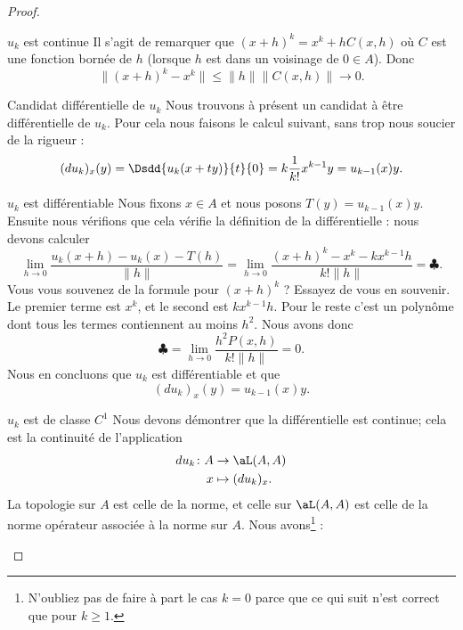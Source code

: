 \begin{proof}
\begin{subproof}
		\item[\( u_k\) est continue]
		Il s'agit de remarquer que \( (x+h)^k=x^k+hC(x,h)\) où \( C\) est une fonction bornée de \( h\) (lorsque \( h\) est dans un voisinage de \( 0\in A\)). Donc
		\begin{equation}
			\| (x+h)^k-x^k \|\leq \| h \|\| C(x,h) \|\to 0.
		\end{equation}
		\item[Candidat différentielle de \( u_k\)]
		Nous trouvons à présent un candidat à être différentielle de \( u_k\). Pour cela nous faisons le calcul suivant, sans trop nous soucier de la rigueur :
		\begin{equation}
			(du_k)_x(y)=\Dsdd{ u_k(x+ty) }{t}{0}=k\frac{1}{ k! }x^{k-1}y=u_{k-1}(x)y.
		\end{equation}
		\item[\( u_k\) est différentiable]
		Nous fixons \( x\in A\) et nous posons \( T(y)=u_{k-1}(x)y\). Ensuite nous vérifions que cela vérifie la définition de la différentielle : nous devons calculer
		\begin{equation}        \label{EQooNPKGooVmEYAV}
			\lim_{h\to 0} \frac{ u_k(x+h)-u_k(x)-T(h) }{ \| h \| }=\lim_{h\to 0} \frac{ (x+h)^k-x^k-kx^{k-1}h }{ k! \| h \| }=\clubsuit.
		\end{equation}
		Vous vous souvenez de la formule pour \( (x+h)^k\) ? Essayez de vous en souvenir. Le premier terme est \( x^k\), et le second est \( kx^{k-1}h\). Pour le reste c'est un polynôme dont tous les termes contiennent au moins \( h^2\). Nous avons donc
		\begin{equation}
			\clubsuit=\lim_{h\to 0} \frac{ h^2P(x,h) }{ k!\| h \| }=0.
		\end{equation}
		Nous en concluons que \( u_k\) est différentiable et que
		\begin{equation}
			(du_k)_x(y)=u_{k-1}(x)y.
		\end{equation}
		\item[\( u_k\) est de classe \( C^1\)]
		Nous devons démontrer que la différentielle est continue; cela est la continuité de l'application
		\begin{equation}
			\begin{aligned}
				du_k\colon A & \to \aL(A,A)      \\
				x            & \mapsto (du_k)_x.
			\end{aligned}
		\end{equation}
		La topologie sur \( A\) est celle de la norme, et celle sur \( \aL(A,A)\) est celle de la norme opérateur associée à la norme sur \( A\). Nous avons\footnote{N'oubliez pas de faire à part le cas \( k=0\) parce que ce qui suit n'est correct que pour \( k\geq 1\).} :

\end{subproof}
\end{proof}
